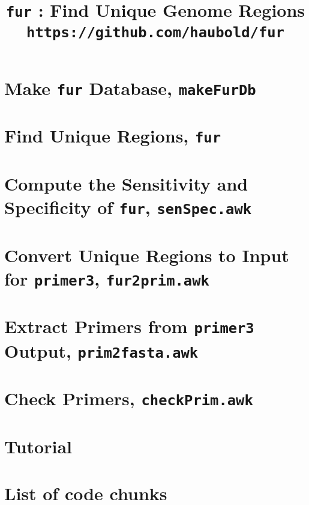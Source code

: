 

\frontmatter
\pagestyle{noweb}

\title{\texttt{fur} : Find Unique Genome
Regions\\\small \texttt{https://github.com/haubold/fur}}
\author{}
\maketitle

\tableofcontents
\listoftheorems[show={tdefn}]
\mainmatter
\chapter{Make \texttt{fur} Database, \texttt{makeFurDb}}\label{ch:makeFurDb}

\chapter{Find Unique Regions, \texttt{fur}}

\chapter{Compute the Sensitivity and Specificity
of \texttt{fur}, \texttt{senSpec.awk}}

\chapter{Convert Unique Regions to Input for \texttt{primer3}, \texttt{fur2prim.awk}}

\chapter{Extract Primers from \texttt{primer3}
Output, \texttt{prim2fasta.awk}}

\chapter{Check Primers, \texttt{checkPrim.awk}}

\chapter{Tutorial}


\backmatter
\chapter{List of code chunks}
\nowebchunks



